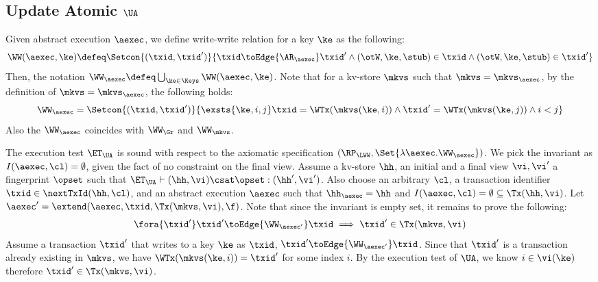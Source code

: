\subsection{Update Atomic \( \UA \)}
\label{sec:sound-complete-ua}

Given abstract execution \( \aexec \), we define write-write relation for a key \( \ke \) as the following:
\[ 
    \WW(\aexec,\ke) \defeq \Setcon{(\txid, \txid')}{\txid \toEdge{\AR_\aexec} \txid' \land (\otW,\ke, \stub ) \in \txid \land (\otW,\ke, \stub ) \in \txid'  } 
\]
Then, the notation \( \WW_\aexec \defeq \bigcup_{\ke \in \Keys} \WW(\aexec, \ke) \).
Note that for a kv-store \( \mkvs \) such that \( \mkvs = \mkvs_\aexec \),
by the definition of  \(  \mkvs = \mkvs_\aexec \), 
the following holds:
\[
    \WW_\aexec = \Setcon{(\txid, \txid')}{\exsts{\ke, i,j } \txid = \WTx(\mkvs(\ke, i)) \land \txid' = \WTx(\mkvs(\ke, j)) \land i < j}
\]
Also the \( \WW_\aexec \) coincides with \( \WW_\Gr \) and \( \WW_\mkvs \).

The execution test $\ET_\UA$ is sound with respect to the axiomatic specification \( (\RP_{\LWW}, \Set{\lambda \aexec. \WW_\aexec }) \).
We pick the invariant as \( I( \aexec, \cl ) = \emptyset \), given the fact of no constraint on the final view.
Assume a kv-store $\hh$, an initial and a final view $\vi, \vi'$  a fingerprint $\opset$ 
such that $\ET_{\UA} \vdash (\hh, \vi) \csat \opset: (\hh', \vi')$. 
Also choose an arbitrary $\cl$, a transaction identifier $\txid \in \nextTxId(\hh, \cl)$, 
and an abstract execution $\aexec$ such that $\hh_{\aexec} = \hh$ and 
\( I(\aexec, \cl) =  \emptyset \subseteq \Tx(\hh, \vi) \).
Let \( \aexec' = \extend(\aexec, \txid, \Tx(\mkvs, \vi), \f ) \).
Note that since the invariant is empty set, it remains to prove the following:
\[
    \begin{array}{@{}l@{}}
        \fora{ \txid' } \txid' \toEdge{\WW_{\aexec'}} \txid \implies \txid' \in \Tx(\mkvs, \vi)
    \end{array}
\]
Assume a transaction \( \txid' \) that writes to a key \( \ke \) as \( \txid \), \ie \( \txid' \toEdge{\WW_{\aexec'}} \txid \).
Since that \( \txid' \) is a transaction already existing in \( \mkvs\),
we have \( \WTx(\mkvs(\ke, i)) = \txid' \) for some index \( i \).
By the execution test of \( \UA \), we know \( i \in \vi(\ke) \) therefore \( \txid' \in \Tx(\mkvs, \vi) \).

